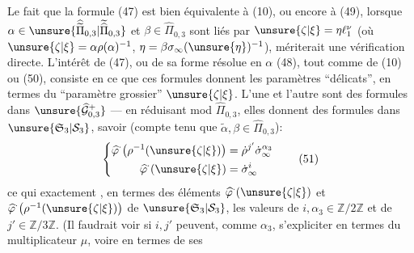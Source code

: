 Le fait que la formule (47) est bien équivalente à (10), ou encore à (49), lorsque $\alpha\in\unsure{\widehat{\widetilde\Pi}_{0,3}|\widetilde{\widehat\Pi}_{0,3}}$ et $\beta\in\widehat\Pi_{0,3}$ sont liés par $\unsure{\zeta|\xi}=\eta\ell_1^\nu$ (où $\unsure{\zeta|\xi}=\alpha\rho(\alpha)^{-1}$, $\eta=\beta\sigma_\infty(\unsure{\eta})^{-1}$), mériterait une vérification directe. L'intérêt de (47), ou de  sa forme résolue en $\alpha$ (48), tout comme de (10) ou (50), consiste en ce que ces formules donnent les paramètres ``délicats''\inserted{$\alpha,\beta$}, en termes du ``paramètre grossier'' $\unsure{\zeta|\xi}$. L'une et l'autre sont des formules dans $\unsure{\widehat{\mathcal G}_{0,3}^{+}}$ --- en réduisant mod $\widehat\Pi_{0,3}$, elles donnent des formules dans $\unsure{\mathfrak S_3|\mathcal S_3}$, savoir (compte tenu que $\widetilde\alpha,\beta\in\widehat\Pi_{0,3}$):
\[
\left\{
\begin{aligned}
\widehat{\varphi}^{\cdot}\bigl(\rho^{-1}(\unsure{\zeta|\xi})\bigr)&=\dot\rho^{j'}\dot\sigma_\infty^{\alpha_3}\\
\widehat{\varphi}^{\cdot}(\unsure{\zeta|\xi})&=\dot\sigma_\infty^i
\end{aligned}
\right.
\tag{51}
\]
ce qui  exactement , en termes des éléments $\widehat{\varphi}^{\cdot}(\unsure{\zeta|\xi})$ et $\widehat{\varphi}^{\cdot}\bigl(\rho^{-1}(\unsure{\zeta|\xi})\bigr)$ de $\unsure{\mathfrak S_3|\mathcal S_3}$, les valeurs de $i,\alpha_3\in\mathbb Z/2\mathbb Z$ et de $j'\in\mathbb Z/3\mathbb Z$. (Il faudrait voir si $i,j'$ peuvent, comme $\alpha_3$, s'expliciter en termes du multiplicateur $\mu$, voire en termes de ses


